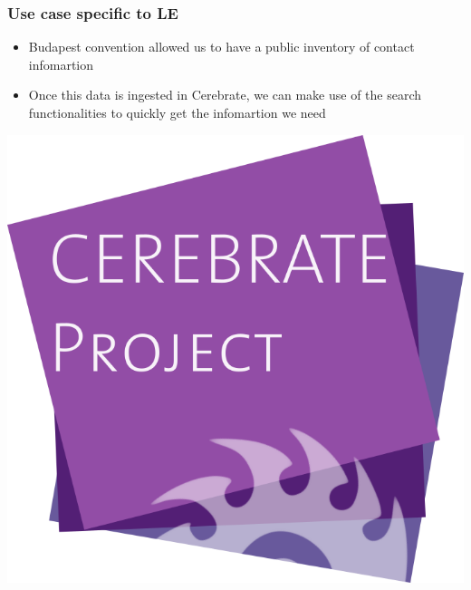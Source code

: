 \begin{frame}
    \frametitle{Use case specific to LE}
    \begin{itemize}
        \item Budapest convention allowed us to have a public inventory of contact infomartion
        \item Once this data is ingested in Cerebrate, we can make use of the search functionalities to quickly get the infomartion we need
    \end{itemize}
    \includegraphics[width=1.0\linewidth]{pictures/cerebrate-logo.png}
\end{frame}

